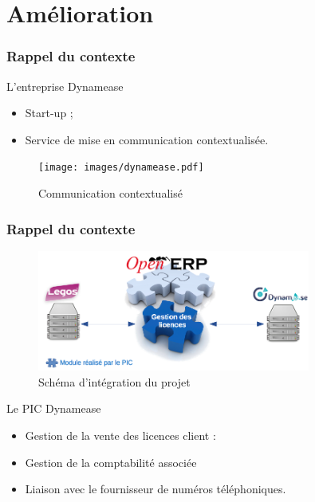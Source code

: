 \section{Amélioration}
\author{Kévin Moreau}


\begin{frame}
	\frametitle{Rappel du contexte}

	\begin{block}{L'entreprise Dynamease}
	 \begin{itemize}
      \item Start-up ;
	  \item Service de mise en communication contextualisée.
	 \end{itemize}
	\end{block}

    \begin{center}
	  \begin{figure}
        \texttt{[image: images/dynamease.pdf]}
	   \caption{Communication contextualisé}
	  \end{figure}
	\end{center}
\end{frame}

\begin{frame}
	\frametitle{Rappel du contexte}
	
	\begin{center}
	  \begin{figure}
	   \includegraphics[width=0.80\textwidth]{images/schemaGlobal.png}
	   \caption{Schéma d'intégration du projet}
	  \end{figure}
	\end{center}

    \begin{block}{Le PIC Dynamease}
	 \begin{itemize}
	  \item Gestion de la vente des licences client :
      \item Gestion de la comptabilité associée
	  \item Liaison avec le fournisseur de numéros téléphoniques.
	 \end{itemize}
	\end{block}

\end{frame}


